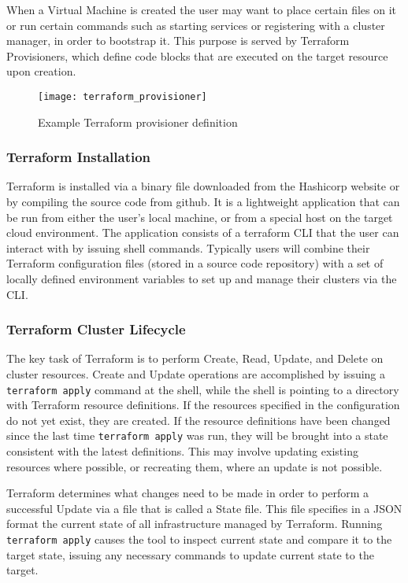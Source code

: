 When a Virtual Machine is created the user may want to place certain files on it or run certain commands such as starting services or registering with a cluster manager, in order to bootstrap it. This purpose is served by Terraform Provisioners, which define code blocks that are executed on the target resource upon creation.

\begin{figure}[h]
\texttt{[image: terraform\_provisioner]}
\centering
\caption {Example Terraform provisioner definition}
\label{fig:terraform_provisioner}
\end{figure}

\subsubsection {Terraform Installation}

Terraform is installed via a binary file downloaded from the Hashicorp website or by compiling the source code from github. It is a lightweight application that can be run from either the user's local machine, or from a special host on the target cloud environment. The application consists of a terraform CLI that the user can interact with by issuing shell commands. Typically users will combine their Terraform configuration files (stored in a source code repository) with a set of locally defined environment variables to set up and manage their clusters via the CLI.

\subsubsection {Terraform Cluster Lifecycle}

The key task of Terraform is to perform Create, Read, Update, and Delete on cluster resources. Create and Update operations are accomplished by issuing a \texttt{terraform apply} command at the shell, while the shell is pointing to a directory with Terraform resource definitions. If the resources specified in the configuration do not yet exist, they are created. If the resource definitions have been changed since the last time \texttt{terraform apply} was run, they will be brought into a state consistent with the latest definitions. This may involve updating existing resources where possible, or recreating them, where an update is not possible.

Terraform determines what changes need to be made in order to perform a successful Update via a file that is called a State file. This file specifies in a JSON format the current state of all infrastructure managed by Terraform. Running \texttt{terraform apply} causes the tool to inspect current state and compare it to the target state, issuing any necessary commands to update current state to the target.

